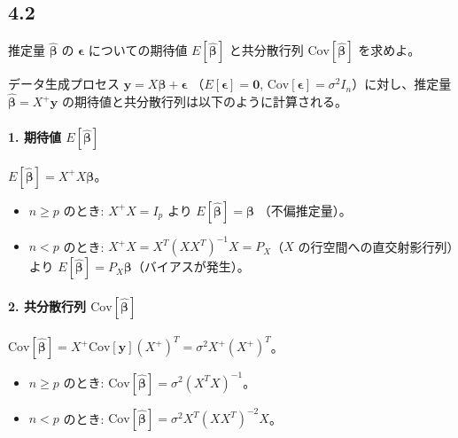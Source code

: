 \documentclass[11pt,a4paper,dvipdfmx]{article}
\numberwithin{equation}{section}
\newenvironment{note}[0]
{
    \begin{tcolorbox}[sharp corners, colframe=gray!20, colback=gray!20, width=\textwidth]
}
{
    \end{tcolorbox}
}
\begin{document}
\subsection*{4.2}
\begin{note}
推定量 $\hat{\bm{\beta}}$ の $\bm{\epsilon}$ についての期待値 $E[\hat{\bm{\beta}}]$ と共分散行列 $\text{Cov}[\hat{\bm{\beta}}]$ を求めよ。
\end{note}
\begin{proofbox}
データ生成プロセス $\bm{y} = X\bm{\beta} + \bm{\epsilon}$ （$E[\bm{\epsilon}] = \bm{0}$, $\text{Cov}[\bm{\epsilon}] = \sigma^2 I_n$）に対し、推定量 $\hat{\bm{\beta}} = X^+ \bm{y}$ の期待値と共分散行列は以下のように計算される。

\paragraph{1. 期待値 $E[\hat{\bm{\beta}}]$}
$E[\hat{\bm{\beta}}] = X^+ X \bm{\beta}$。
\begin{itemize}
    \item $n \ge p$ のとき: $X^+ X = I_p$ より $E[\hat{\bm{\beta}}] = \bm{\beta}$ （不偏推定量）。
    \item $n < p$ のとき: $X^+ X = X^T (X X^T)^{-1} X = P_X$（$X$ の行空間への直交射影行列）より $E[\hat{\bm{\beta}}] = P_X \bm{\beta}$（バイアスが発生）。
\end{itemize}

\paragraph{2. 共分散行列 $\text{Cov}[\hat{\bm{\beta}}]$}
$\text{Cov}[\hat{\bm{\beta}}] = X^+ \text{Cov}[\bm{y}] (X^+)^T = \sigma^2 X^+ (X^+)^T$。
\begin{itemize}
    \item $n \ge p$ のとき: $\text{Cov}[\hat{\bm{\beta}}] = \sigma^2 (X^T X)^{-1}$。
    \item $n < p$ のとき: $\text{Cov}[\hat{\bm{\beta}}] = \sigma^2 X^T (X X^T)^{-2} X$。
\end{itemize}
\end{proofbox}
\end{document}
